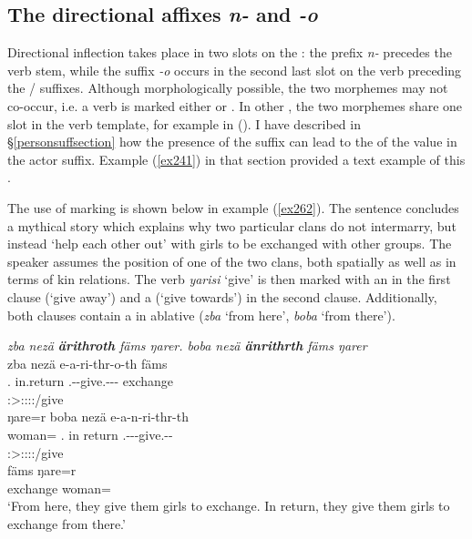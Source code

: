 \subsection{The directional affixes \emph{n-} and \emph{-o}} \label{directionalinflection}

Directional inflection takes place in two slots on the : the  prefix \emph{n-} precedes the verb stem, while the  suffix \emph{-o} occurs in the second last slot on the verb preceding the / suffixes. Although morphologically possible, the two morphemes may not co-occur, i.e. a verb is marked either  or . In other , the two morphemes share one slot in the verb template, for example in  (\citealt{Evans:2015to}). I have described in {\S{}\ref{personsuffsection}} how the presence of the  suffix can lead to the  of the  value in the actor suffix. Example (\ref{ex241}) in that section provided a text example of this .%

The use of  marking is shown below in example (\ref{ex262}). The sentence concludes a mythical story which explains why two particular clans do not intermarry, but instead `help each other out' with girls to be exchanged with other groups. The speaker assumes the position of one of the two clans, both spatially as well as in terms of kin relations. The verb \emph{yarisi} `give' is then marked with an  in the first clause (`give away') and a  (`give towards') in the second clause. Additionally, both clauses contain a  in ablative  (\emph{zba} `from here', \emph{boba} `from there').

\begin{exe}
	\ex \emph{zba nezä \textbf{ärithroth} fäms ŋarer. boba nezä \textbf{änrithrth} fäms ŋarer}\\
	\glll zba nezä e-a-ri-thr-o-th fäms\\
	\Prox.\Abl{} in.return \Stnsg.\Alph-\Vc-give.\Ext-\Ndu-\Andat-\Nsg{} exchange\\
	{} {} \footnotesize{\Stpl:\Sbj>\Stpl:\Io:\Nonpast:\Ipfv:\Andat/give} {}\\
	\sn
	\glll ŋare=r boba nezä e-a-n-ri-thr-th\\
	woman=\Purp{} \Med.\Abl{} {in return} \Stnsg.\Alph-\Vc-\Venit-give.\Ext-\Ndu-\Stnsg{}\\
	{} {} {} \footnotesize{\Stpl:\Sbj>\Stpl:\Io:\Nonpast:\Ipfv:\Venit/give} {} {}\\
	\sn
	\gll fäms ŋare=r\\
	exchange woman=\Purp{}\\
	\trans `From here, they give them girls to exchange. In return, they give them girls to exchange from there.' 
	\label{ex262}
\end{exe}

